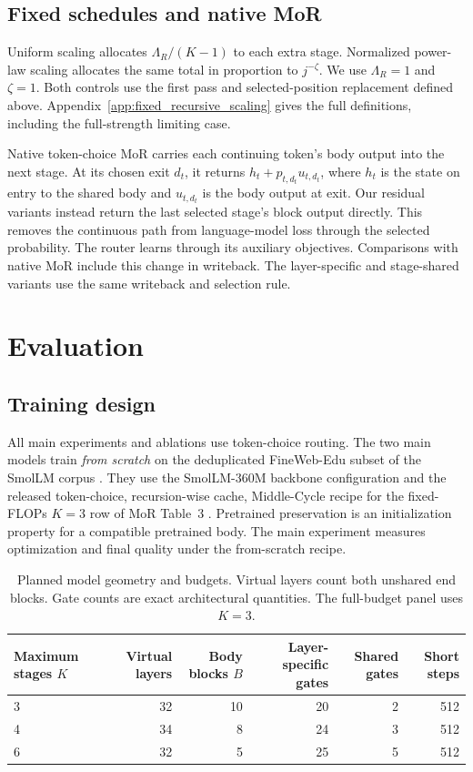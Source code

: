 \documentclass[11pt,letterpaper]{article}
\begin{document}
\subsection{Fixed schedules and native MoR}
\label{sec:controls}
Uniform scaling allocates \(\Lambda_R/(K-1)\) to each extra stage. Normalized power-law scaling allocates the same total in proportion to \(j^{-\zeta}\). We use \(\Lambda_R=1\) and \(\zeta=1\). Both controls use the first pass and selected-position replacement defined above. Appendix~\ref{app:fixed_recursive_scaling} gives the full definitions, including the full-strength limiting case.

Native token-choice MoR carries each continuing token's body output into the next stage. At its chosen exit \(d_t\), it returns \(h_t+p_{t,d_t}u_{t,d_t}\), where \(h_t\) is the state on entry to the shared body and \(u_{t,d_t}\) is the body output at exit. Our residual variants instead return the last selected stage's block output directly. This removes the continuous path from language-model loss through the selected probability. The router learns through its auxiliary objectives. Comparisons with native MoR include this change in writeback. The layer-specific and stage-shared variants use the same writeback and selection rule.

\section{Evaluation}
\label{sec:evaluation}
\subsection{Training design}
All main experiments and ablations use token-choice routing. The two main models train \emph{from scratch} on the deduplicated FineWeb-Edu subset of the SmolLM corpus \citep{fineweb,smolcorpus}. They use the SmolLM-360M backbone configuration \citep{smolconfig} and the released token-choice, recursion-wise cache, Middle-Cycle recipe for the fixed-FLOPs \(K=3\) row of MoR Table~3 \citep{bae2025mor}. Pretrained preservation is an initialization property for a compatible pretrained body. The main experiment measures optimization and final quality under the from-scratch recipe.

\begin{table}[htbp]
\centering
\caption{Planned model geometry and budgets. Virtual layers count both unshared end blocks. Gate counts are exact architectural quantities. The full-budget panel uses \(K=3\).}
\label{tab:geometry}
\small
\begin{tabular}{@{}lrrrrr@{}}
\toprule
Maximum stages \(K\) & Virtual layers & Body blocks \(B\) & Layer-specific gates & Shared gates & Short steps\\
\midrule
3 & 32 & 10 & 20 & 2 & 512\\
4 & 34 &  8 & 24 & 3 & 512\\
6 & 32 &  5 & 25 & 5 & 512\\
\bottomrule
\end{tabular}
\end{table}
\end{document}
